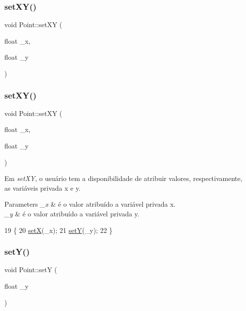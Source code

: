 \subsubsection{\texorpdfstring{set\+X\+Y()}{setXY()}\hspace{0.1cm}{\footnotesize\ttfamily [1/2]}}
{\footnotesize\ttfamily void Point\+::set\+XY (\begin{DoxyParamCaption}\item[{float}]{\+\_\+x,  }\item[{float}]{\+\_\+y }\end{DoxyParamCaption})}

\mbox{\label{class_point_ab5385c6d9bfa841e641e4709fc9f14cc}} 
\subsubsection{\texorpdfstring{set\+X\+Y()}{setXY()}\hspace{0.1cm}{\footnotesize\ttfamily [2/2]}}
{\footnotesize\ttfamily void Point\+::set\+XY (\begin{DoxyParamCaption}\item[{float}]{\+\_\+x,  }\item[{float}]{\+\_\+y }\end{DoxyParamCaption})}



Em {\itshape set\+XY}, o usuário tem a disponibilidade de atribuir valores, respectivamente, as variáveis privada x e y. 


\begin{DoxyParams}{Parameters}
{\em \+\_\+x} & é o valor atribuído a variável privada x. \\
\hline
{\em \+\_\+y} & é o valor atribuído a variável privada y. \\
\hline
\end{DoxyParams}

\begin{DoxyCode}
19                                    \{
20     \hyperlink{class_point_a428a1676e2fdec6753c42011a1d59d18}{setX}(\_x);
21     \hyperlink{class_point_a9868c4601b0ea0c2d0de20fe41ee0e49}{setY}(\_y);
22 \}
\end{DoxyCode}
\mbox{\label{class_point_a9868c4601b0ea0c2d0de20fe41ee0e49}} 
\subsubsection{\texorpdfstring{set\+Y()}{setY()}\hspace{0.1cm}{\footnotesize\ttfamily [1/2]}}
{\footnotesize\ttfamily void Point\+::setY (\begin{DoxyParamCaption}\item[{float}]{\+\_\+y }\end{DoxyParamCaption})}

